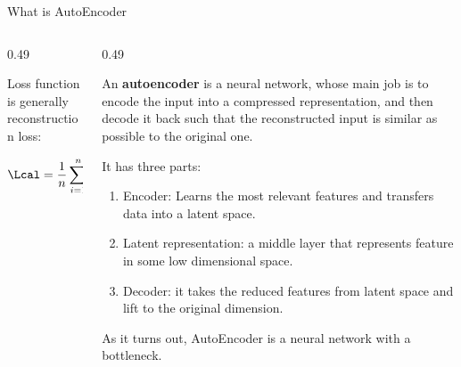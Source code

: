\documentclass[aspectratio=169,xcolor=dvipsnames,svgnames,x11names,fleqn]{beamer}
\begin{document}
\begin{frame}{What is AutoEncoder}
\begin{columns}[T]
\begin{column}{0.49\textwidth}
{
}
\footnotesize

Loss function is generally reconstruction loss:

\begin{align*}
\Lcal = \frac{1}{n}\sum_{i=1}^n ||\xbf_i - \xbf_i^d||_2^2
\end{align*}
\end{column}

 \begin{column}{0.49\textwidth}

\footnotesize

An \textbf{autoencoder} is  a neural network, whose main job is to encode the input into a compressed  representation, and then decode it back such that the reconstructed input is similar as possible to the original one.

It has three parts:
\begin{enumerate}
\item Encoder: Learns the most relevant features and transfers data into a latent space.
\item Latent representation: a middle layer that represents feature in some low dimensional space.
\item Decoder: it takes the reduced features from latent space and lift to the original dimension.
\end{enumerate}
As it turns out, AutoEncoder is a neural network with a bottleneck. 

\end{column}

\end{columns}


\end{frame}
\end{document}
